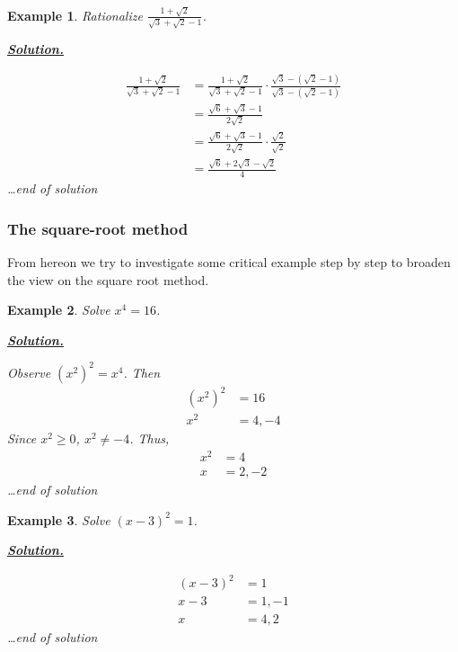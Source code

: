 \documentclass[12pt]{article}
\newtheorem*{example}{Example}
\newenvironment{solution}{\begin{snugshade*} \underline{\textbf{Solution.}} \par}{\hfill \textit{\dots end of solution} \end{snugshade*}}
\begin{document}
    \begin{example}
        Rationalize $\frac{1+\sqrt{2}}{\sqrt{3}+\sqrt{2}-1}$.

        \begin{solution}
            \begin{align*}
                \frac{1+\sqrt{2}}{\sqrt{3}+\sqrt{2}-1}&=\frac{1+\sqrt{2}}{\sqrt{3}+\sqrt{2}-1}\cdot \frac{\sqrt{3}-(\sqrt{2}-1)}{\sqrt{3}-(\sqrt{2}-1)}\\
                &=\frac{\sqrt{6}+\sqrt{3}-1}{2\sqrt{2}}\\
                &=\frac{\sqrt{6}+\sqrt{3}-1}{2\sqrt{2}}\cdot \frac{\sqrt{2}}{\sqrt{2}}\\
                &=\frac{\sqrt{6}+2\sqrt{3}-\sqrt{2}}{4}
            \end{align*}
        \end{solution}
    \end{example}
    \subsubsection*{The square-root method}

    From hereon we try to investigate some critical example step by step to broaden the view on the square root method.

    \begin{example}
        Solve $x^4=16$.

        \begin{solution}
            Observe $(x^2)^2=x^4$. Then \begin{align*}
                (x^2)^2&=16\\
                x^2&=4,-4
            \end{align*}
            Since $x^2\geq 0$, $x^2\neq -4$. Thus,\begin{align*}
                x^2&=4\\
                x&=2,-2
            \end{align*}
        \end{solution}
    \end{example}

    \begin{example}
        Solve $(x-3)^2=1$.

        \begin{solution}
            \begin{align*}
                (x-3)^2&=1\\
                x-3&=1, -1\\
                x&=4, 2
            \end{align*}
        \end{solution}
    \end{example}
\end{document}
